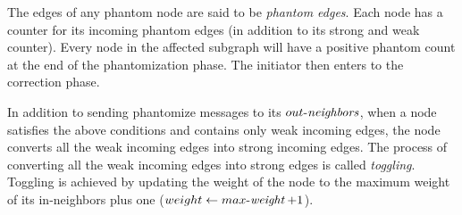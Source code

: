 The edges of any phantom node are said to be \emph{phantom edges}.
Each node has a counter for its incoming phantom edges
(in addition to its strong and weak counter). Every node in the affected subgraph
will have a positive phantom count at the end of the phantomization phase. The initiator then enters to the correction phase. 


In addition to sending phantomize messages to its $\mathop{\mbox{$out$-$\mathit{neighbors}$}}$, when a node satisfies the
above conditions and contains only weak incoming edges, the node converts all the weak
incoming edges into strong incoming edges. %
The process of converting all the weak incoming edges into strong
edges is called \emph{toggling}. Toggling is achieved by updating the weight
of the node to the maximum weight of its in-neighbors plus one ($weight \leftarrow \mathop{\mbox{$max$-$\mathit{weight}$}}+1$).


